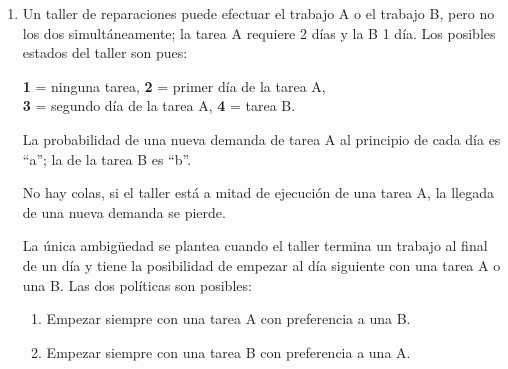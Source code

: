 \documentclass{templateNote}
\begin{document}
\begin{enumerate}[start = 3]

    \newpage
    \item Un taller de reparaciones puede efectuar el trabajo A o el trabajo B, pero no los dos
    simultáneamente; la tarea A requiere 2 días y la B 1 día. Los posibles estados del taller son
    pues:

    \begin{center}
        \textbf{1} = ninguna tarea, \textbf{2} = primer día de la tarea A, \\\textbf{3} = segundo día de la tarea A, \textbf{4} = tarea B.
    \end{center}

    La probabilidad de una nueva demanda de tarea A al principio de cada día es “a”; la de la tarea B es “b”. 

    No hay colas, si el taller está a mitad de ejecución de una tarea A, la llegada de una nueva demanda se pierde. 

    La única ambigüedad se plantea cuando el taller termina un trabajo al final de un día y tiene la posibilidad de empezar al día siguiente con una tarea A o una B. Las dos políticas son posibles:

    \begin{enumerate}[label = \arabic*)]
        \item Empezar siempre con una tarea A con preferencia a una B.
        \item Empezar siempre con una tarea B con preferencia a una A.
    \end{enumerate}


\end{enumerate}
\end{document}

